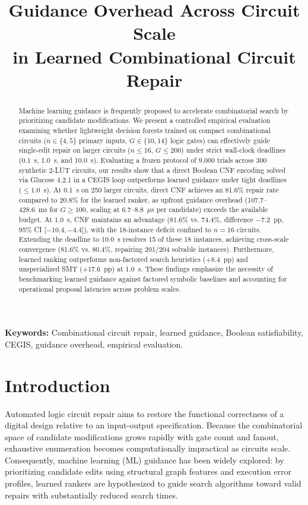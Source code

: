\documentclass[11pt,a4paper]{article}
\title{\LARGE\textbf{Guidance Overhead Across Circuit Scale\\in Learned Combinational Circuit Repair}}
\author{}
\date{}
\begin{document}
\maketitle
\linenumbers

\begin{abstract}
Machine learning guidance is frequently proposed to accelerate combinatorial search by prioritizing candidate modifications. We present a controlled empirical evaluation examining whether lightweight decision forests trained on compact combinational circuits ($n \in \{4, 5\}$ primary inputs, $G \in \{10, 14\}$ logic gates) can effectively guide single-edit repair on larger circuits ($n \le 16$, $G \le 200$) under strict wall-clock deadlines (0.1~s, 1.0~s, and 10.0~s). Evaluating a frozen protocol of 9,000 trials across 300 synthetic 2-LUT circuits, our results show that a direct Boolean CNF encoding solved via Glucose 4.2.1 in a CEGIS loop outperforms learned guidance under tight deadlines ($\le 1.0$~s). At 0.1~s on 250 larger circuits, direct CNF achieves an 81.6\% repair rate compared to 20.8\% for the learned ranker, as upfront guidance overhead (107.7--428.6~ms for $G \ge 100$, scaling at 6.7--8.8~$\mu$s per candidate) exceeds the available budget. At 1.0~s, CNF maintains an advantage (81.6\% vs. 74.4\%, difference $-7.2$~pp, 95\% CI [$-10.4, -4.4$]), with the 18-instance deficit confined to $n=16$ circuits. Extending the deadline to 10.0~s resolves 15 of these 18 instances, achieving cross-scale convergence (81.6\% vs. 80.4\%, repairing 201/204 solvable instances). Furthermore, learned ranking outperforms non-factored search heuristics (+8.4~pp) and unspecialized SMT (+17.6~pp) at 1.0~s. These findings emphasize the necessity of benchmarking learned guidance against factored symbolic baselines and accounting for operational proposal latencies across problem scales.
\end{abstract}

\vspace{0.5em}
\noindent\textbf{Keywords:} Combinational circuit repair, learned guidance, Boolean satisfiability, CEGIS, guidance overhead, empirical evaluation.

\section{Introduction}
Automated logic circuit repair aims to restore the functional correctness of a digital design relative to an input-output specification. Because the combinatorial space of candidate modifications grows rapidly with gate count and fanout, exhaustive enumeration becomes computationally impractical as circuits scale. Consequently, machine learning (ML) guidance has been widely explored: by prioritizing candidate edits using structural graph features and execution error profiles, learned rankers are hypothesized to guide search algorithms toward valid repairs with substantially reduced search times.
\end{document}
